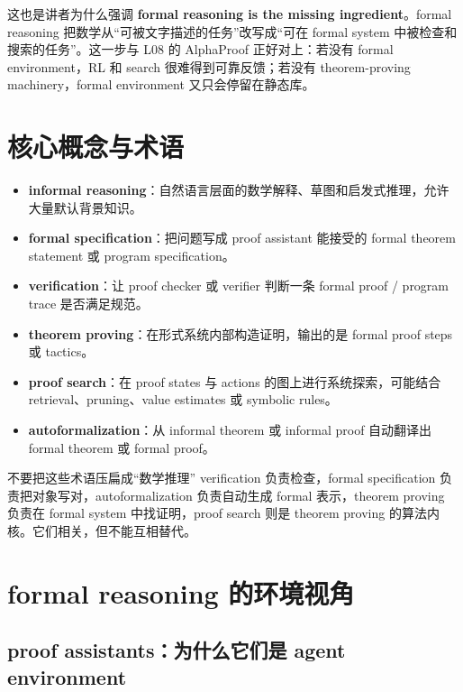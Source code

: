 \documentclass[a4paper]{article}
\begin{document}
这也是讲者为什么强调 \textbf{formal reasoning is the missing ingredient}。formal reasoning 把数学从“可被文字描述的任务”改写成“可在 formal system 中被检查和搜索的任务”。这一步与 L08 的 AlphaProof 正好对上：若没有 formal environment，RL 和 search 很难得到可靠反馈；若没有 theorem-proving machinery，formal environment 又只会停留在静态库。

\section{核心概念与术语}

\begin{itemize}
\item \textbf{informal reasoning}：自然语言层面的数学解释、草图和启发式推理，允许大量默认背景知识。
\item \textbf{formal specification}：把问题写成 proof assistant 能接受的 formal theorem statement 或 program specification。
\item \textbf{verification}：让 proof checker 或 verifier 判断一条 formal proof / program trace 是否满足规范。
\item \textbf{theorem proving}：在形式系统内部构造证明，输出的是 formal proof steps 或 tactics。
\item \textbf{proof search}：在 proof states 与 actions 的图上进行系统探索，可能结合 retrieval、pruning、value estimates 或 symbolic rules。
\item \textbf{autoformalization}：从 informal theorem 或 informal proof 自动翻译出 formal theorem 或 formal proof。
\end{itemize}

\begin{knowledgebox}{不要把这些术语压扁成“数学推理”}
verification 负责检查，formal specification 负责把对象写对，autoformalization 负责自动生成 formal 表示，theorem proving 负责在 formal system 中找证明，proof search 则是 theorem proving 的算法内核。它们相关，但不能互相替代。
\end{knowledgebox}

\section{formal reasoning 的环境视角}

\subsection{proof assistants：为什么它们是 agent environment}
\end{document}
